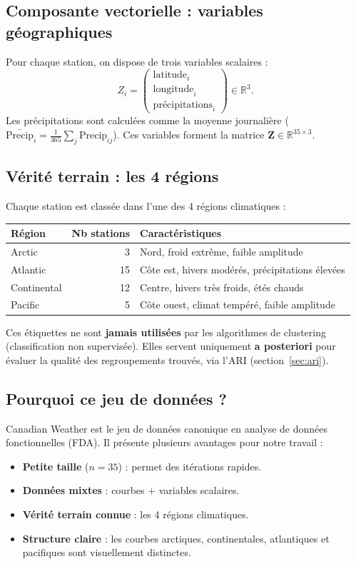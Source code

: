 \documentclass[11pt, a4paper]{article}
\newcommand{\R}{\mathbb{R}}
\theoremstyle{definition}
\theoremstyle{remark}
\begin{document}
\subsection{Composante vectorielle : variables géographiques}

Pour chaque station, on dispose de trois variables scalaires :
\[
  Z_i = \begin{pmatrix} \text{latitude}_i \\ \text{longitude}_i \\ \text{précipitations}_i \end{pmatrix} \in \R^3.
\]
Les précipitations sont calculées comme la moyenne journalière
($\bar{\text{Precip}}_i = \frac{1}{365} \sum_j \text{Precip}_{ij}$).
Ces variables forment la matrice $\mathbf{Z} \in \R^{35 \times 3}$.

\subsection{Vérité terrain : les 4 régions}

Chaque station est classée dans l'une des 4 régions climatiques :
\begin{center}
\begin{tabular}{lrl}
  \toprule
  \textbf{Région} & \textbf{Nb stations} & \textbf{Caractéristiques} \\
  \midrule
  Arctic       & 3  & Nord, froid extrême, faible amplitude \\
  Atlantic     & 15 & Côte est, hivers modérés, précipitations élevées \\
  Continental  & 12 & Centre, hivers très froids, étés chauds \\
  Pacific      & 5  & Côte ouest, climat tempéré, faible amplitude \\
  \bottomrule
\end{tabular}
\end{center}
Ces étiquettes ne sont \textbf{jamais utilisées} par les algorithmes de
clustering (classification non supervisée). Elles servent uniquement
\textbf{a posteriori} pour évaluer la qualité des regroupements trouvés,
via l'ARI (section~\ref{sec:ari}).

\subsection{Pourquoi ce jeu de données ?}

Canadian Weather est le jeu de données canonique en analyse de données
fonctionnelles (FDA). Il présente plusieurs avantages pour notre travail :
\begin{itemize}[nosep]
  \item \textbf{Petite taille} ($n = 35$) : permet des itérations rapides.
  \item \textbf{Données mixtes} : courbes + variables scalaires.
  \item \textbf{Vérité terrain connue} : les 4 régions climatiques.
  \item \textbf{Structure claire} : les courbes arctiques, continentales,
    atlantiques et pacifiques sont visuellement distinctes.
\end{itemize}
\end{document}
